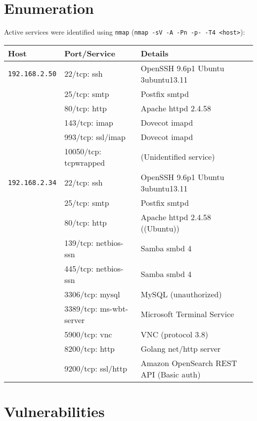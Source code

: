 \documentclass[a4paper,12pt]{article}
\begin{document}
\section{Enumeration}
Active services were identified using \texttt{nmap} (\texttt{nmap -sV -A -Pn -p- -T4 <host>}):
\begin{table}[ht]
    \centering
    \begin{tabular}{lll}
        \toprule
        \rowcolor{gray!20} \textbf{Host} & \textbf{Port/Service} & \textbf{Details} \\
        \midrule
        \texttt{192.168.2.50} 
            & 22/tcp: ssh & OpenSSH 9.6p1 Ubuntu 3ubuntu13.11 \\
            & 25/tcp: smtp & Postfix smtpd \\
            & 80/tcp: http & Apache httpd 2.4.58 \\
            & 143/tcp: imap & Dovecot imapd \\
            & 993/tcp: ssl/imap & Dovecot imapd \\
            & 10050/tcp: tcpwrapped & (Unidentified service) \\ \hline
        \texttt{192.168.2.34} 
            & 22/tcp: ssh & OpenSSH 9.6p1 Ubuntu 3ubuntu13.11 \\
            & 25/tcp: smtp & Postfix smtpd \\
            & 80/tcp: http & Apache httpd 2.4.58 ((Ubuntu)) \\
            & 139/tcp: netbios-ssn & Samba smbd 4 \\
            & 445/tcp: netbios-ssn & Samba smbd 4 \\
            & 3306/tcp: mysql & MySQL (unauthorized) \\
            & 3389/tcp: ms-wbt-server & Microsoft Terminal Service \\
            & 5900/tcp: vnc & VNC (protocol 3.8) \\
            & 8200/tcp: http & Golang net/http server \\
            & 9200/tcp: ssl/http & Amazon OpenSearch REST API (Basic auth) \\
        \bottomrule
    \end{tabular}
\end{table}

\clearpage

\section{Vulnerabilities}
\end{document}

